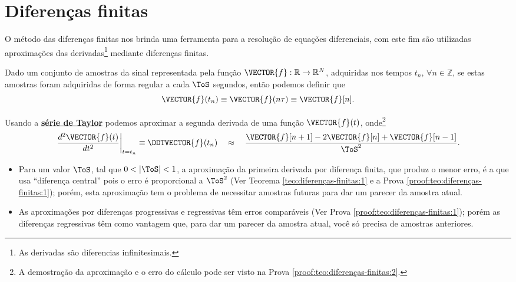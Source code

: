 \section{Diferenças finitas}

O método das diferenças finitas nos brinda uma ferramenta para a resolução de 
equações diferenciais, com este fim são utilizadas aproximações das derivadas\footnote{As 
derivadas são diferencias infinitesimais.} 
mediante diferenças finitas.

\begin{definition}
\label{def:diferenças-finitas:0}
Dado um conjunto de amostras da sinal representada pela função $\VECTOR{f}: \mathbb{R} \rightarrow \mathbb{R}^N$, 
adquiridas nos  tempos $t_n$, $\forall n \in \mathbb{Z}$, 
se estas amostras foram adquiridas de forma regular a cada $\ToS$ segundos,
então podemos definir que
\begin{equation}
\VECTOR{f}(t_n)\equiv \VECTOR{f}(n\tau) \equiv \VECTOR{f}[n].
\end{equation}
\end{definition}

\begin{theorem}
\label{teo:diferenças-finitas:2}
Usando a \hyperref[def:taylor]{\textbf{série de Taylor}} podemos aproximar 
a segunda derivada de uma função $\VECTOR{f}(t)$, onde\footnote{A
demostração da aproximação e o erro do cálculo pode ser visto na Prova \ref{proof:teo:diferenças-finitas:2}.}
\begin{equation}
\left.\frac{d^2\VECTOR{f}(t)}{dt^2}\right|_{t=t_n}\equiv \DDTVECTOR{f}(t_n)
\quad \approx \quad
\frac{\VECTOR{f}[n+1]-2\VECTOR{f}[n]+\VECTOR{f}[n-1]}{\ToS^2}.
\end{equation}
\end{theorem}

\begin{tcbattention}
\begin{itemize}
\item Para um valor $\ToS$, tal que $0<|\ToS|<1$, a aproximação da primeira derivada por diferença finita, 
que produz o menor erro, é a que usa ``diferença central'' pois o erro é proporcional a ${\ToS}^2$ 
(Ver Teorema \ref{teo:diferenças-finitas:1}
e a Prova \ref{proof:teo:diferenças-finitas:1}); porém, 
esta aproximação tem o problema de necessitar amostras futuras para dar um parecer da amostra atual.
\item As aproximações por diferenças progressivas e regressivas têm erros comparáveis
 (Ver Prova \ref{proof:teo:diferenças-finitas:1});
porém as diferenças regressivas têm como vantagem que, para dar um parecer da amostra atual,
você só precisa de amostras anteriores.
\end{itemize}
\end{tcbattention}


